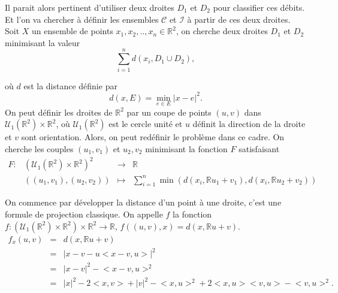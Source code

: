 \documentclass[a4paper,10pt]{article}
\begin{document}
	Il parait alors pertinent d'utiliser deux droites $D_1$ et $D_2$ pour classifier ces débits. Et l'on va chercher à définir les ensembles $\mathcal{C}$ et $\mathcal{I}$ à partir de ces deux droites.
	Soit $X$ un ensemble de points  $x_1, x_2, .., x_n \in \mathbb{R}^2$, on cherche deux droites $D_1$ et $D_2$ minimisant la valeur
	\[\sum_{i=1}^{n}d(x_i, D_1 \cup D_2),\]
	
	où $d$ est la distance définie par 
	\[d(x,E)= \min_{e \in E} |x-e|^2.\]
	On peut définir les droites de $\mathbb{R}^2$ par un coupe de points $(u,v)$ dans $\mathcal{U}_1(\mathbb{R}^2)\times\mathbb{R}^2$, où $\mathcal{U}_1(\mathbb{R}^2)$ est le cercle unité et $u$ définit la direction de la droite et $v$ sont orientation. Alors, on peut redéfinir le problème dans ce cadre. On cherche les couples $(u_1,v_1)$ et $u_2,v_2$ minimisant la fonction $F$ satisfaisant 
	\begin{equation}
		\label{F}
		\begin{array}{cccc}
			F: & (\mathcal{U}_1(\mathbb{R}^2)\times\mathbb{R}^2)^2 &\to &\mathbb{R}\\
			& ((u_1,v_1), (u_2,v_2)) & \mapsto & \sum_{i=1}^{n}\min (d(x_i,\mathbb{R}u_1+v_1), d(x_i,\mathbb{R}u_2+v_2))
		\end{array}
	\end{equation}
	
	
	On commence par développer la distance d'un point à une droite, c'est une formule de projection classique. On appelle $f$ la fonction $f:(\mathcal{U}_1(\mathbb{R}^2)\times\mathbb{R}^2) \times \mathbb{R}^2 \to \mathbb{R}$, $f((u,v),x)=d(x,\mathbb{R}u+v)$.
	\begin{equation}
		\begin{array}{ccc}
			f_x(u,v)&=&d(x,\mathbb{R}u+v)\\
			&=& \big|x-v-u\big<x-v , u\big> \big|^2\\
			&=& \big|x-v\big|^2 -\big<x-v, u\big>^2\\
			&=& \big|x\big|^2-2\big<x,v\big>+\big|v\big|^2 -\big<x, u\big>^2+ 2\big<x, u\big>\big<v, u\big>- \big<v, u\big>^2.
		\end{array}
	\end{equation}
	
\end{document}

